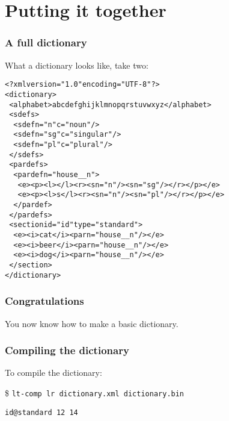 \documentclass{beamer} %
\begin{document}
\section{Putting it together}
\begin{frame}
  \frametitle{A full dictionary}

  \begin{exampleblock}{What a dictionary looks like, take two:}
    \begin{footnotesize}
    \begin{alltt}
      <?xml version="1.0" encoding="UTF-8"?>\\
      <dictionary>\\
      ~<alphabet>abcdefghijklmnopqrstuvwxyz</alphabet>\\
      ~<sdefs>\\
      ~~<sdef n="n" c="noun"/>\\
      ~~<sdef n="sg" c="singular"/>\\
      ~~<sdef n="pl" c="plural"/>\\
      ~</sdefs>\\
      ~<pardefs>\\
      ~~<pardef n="house\_\_n">\\
      ~~~<e><p><l></l><r><s n="n"/><s n="sg"/></r></p></e> \\
      ~~~<e><p><l>s</l><r><s n="n"/><s n="pl"/></r></p></e> \\
      ~~</pardef>\\
      ~</pardefs>\\
      ~<section id="id" type="standard">\\
      ~~<e><i>cat</i><par n="house\_\_n"/></e> \\
      ~~<e><i>beer</i><par n="house\_\_n"/></e> \\
      ~~<e><i>dog</i><par n="house\_\_n"/></e> \\
      ~</section>\\
      </dictionary>\\
    \end{alltt}
    \end{footnotesize}
\end{exampleblock}
\end{frame}

\begin{frame}
\frametitle{Congratulations}
You now know how to make a basic dictionary.
\end{frame}

\begin{frame}
\frametitle{Compiling the dictionary}

To compile the dictionary:

\$ {\tt lt-comp lr dictionary.xml dictionary.bin}

{\tt id@standard 12 14}

\end{frame}
\end{document}
